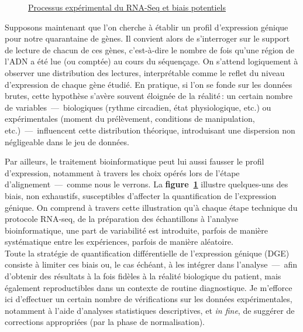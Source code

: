 \begin{figure}
{
 }
 \caption{\underline{Processus expérimental du RNA-Seq et biais potentiels}}
 \label{fig:biaisRNA}
 \end{figure}

Supposons maintenant que l’on cherche à établir un profil d’expression génique pour notre quarantaine de gènes.  
Il convient alors de s’interroger sur le support de lecture de chacun de ces gènes, c’est-à-dire le nombre de fois qu’une région de l’ADN a été lue (ou comptée) au cours du séquençage.  
On s’attend logiquement à observer une distribution des lectures, interprétable comme le reflet du niveau d’expression de chaque gène étudié.  
En pratique, si l’on se fonde sur les données brutes, cette hypothèse s’avère souvent éloignée de la réalité : un certain nombre de variables~—~biologiques (rythme circadien, état physiologique, etc.) ou expérimentales (moment du prélèvement, conditions de manipulation, etc.)~—~influencent cette distribution théorique, introduisant une dispersion non négligeable dans le jeu de données.

Par ailleurs, le traitement bioinformatique peut lui aussi fausser le profil d’expression, notamment à travers les choix opérés lors de l’étape d’alignement~—~comme nous le verrons.  
La \textbf{figure~\ref{fig:biaisRNA}} illustre quelques-uns des biais, non exhaustifs, susceptibles d’affecter la quantification de l’expression génique.  
On comprend à travers cette illustration qu’à chaque étape technique du protocole RNA-seq, de la préparation des échantillons à l’analyse bioinformatique, une part de variabilité est introduite, parfois de manière systématique entre les expériences, parfois de manière aléatoire.\\

Toute la stratégie de quantification différentielle de l’expression génique (DGE) consiste à limiter ces biais ou, le cas échéant, à les intégrer dans l’analyse~—~afin d’obtenir des résultats à la fois fidèles à la réalité biologique du patient, mais également reproductibles dans un contexte de routine diagnostique.  Je m'efforce ici d’effectuer un certain nombre de vérifications sur les données expérimentales, notamment à l’aide d’analyses statistiques descriptives, et \textit{in fine}, de suggérer de corrections appropriées (par la phase de normalisation).

